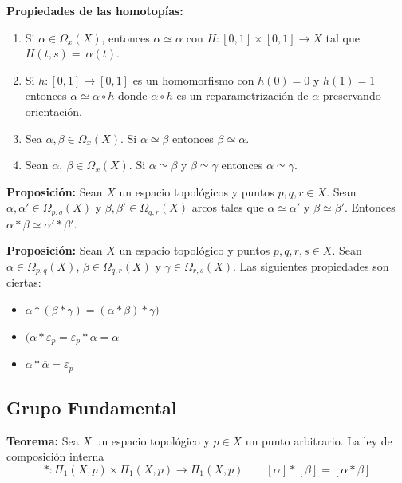 \documentclass{article}
\begin{document}
\textbf{Propiedades de las homotopías:}
\begin{enumerate}
\item Si $\alpha\in \Omega_x(X)$, entonces $\alpha\simeq \alpha$ con $H:[0,1]\times [0,1]\rightarrow X$ tal que $H(t,s)=~\alpha(t)$.

\item Si $h:[0,1]\rightarrow [0,1]$ es un homomorfismo con $h(0)=0$ y $h(1)=1$ entonces $\alpha\simeq \alpha\circ h$ donde $\alpha \circ h$ es un reparametrización de $\alpha$ preservando orientación.

\item Sea $\alpha,\beta \in \Omega_x(X)$. Si $\alpha\simeq \beta$ entonces $\beta \simeq \alpha$.

\item Sean $\alpha,\:\beta\in \Omega_x(X)$. Si $\alpha\simeq \beta$ y $\beta\simeq \gamma$ entonces $\alpha\simeq \gamma$.
\end{enumerate}

\textbf{Proposición:} Sean $X$ un espacio topológicos y puntos $p,q,r\in X$. Sean $\alpha,\alpha'\in \Omega_{p,q}(X)$ y $\beta,\beta'\in \Omega_{q,r}(X)$ arcos tales que $\alpha\simeq \alpha'$ y $\beta\simeq \beta'$. Entonces $\alpha*\beta\simeq \alpha'*\beta'$.

\textbf{Proposición:} Sean $X$ un espacio topológico y puntos $p,q,r,s\in X$. Sean $\alpha \in \Omega_{p,q}(X)$, $\beta\in \Omega_{q,r}(X)$ y $\gamma\in \Omega_{r,s}(X)$. Las siguientes propiedades son ciertas:

\begin{itemize}
\item $\alpha*(\beta*\gamma)=(\alpha*\beta)*\gamma)$

\item $(\alpha*\varepsilon_p=\varepsilon_p*\alpha=\alpha$

\item $	\alpha*\overline{\alpha} = \varepsilon_p$
\end{itemize}

\subsection{Grupo Fundamental}
\textbf{Teorema:} Sea $X$ un espacio topológico y $p\in X$ un punto arbitrario. La ley de composición interna
\begin{equation*}
*:\Pi_1(X,p)\times\Pi_1(X,p)\rightarrow\Pi_1(X,p)\qquad [\alpha]*[\beta]=[\alpha*\beta]
\end{equation*}
\end{document}
